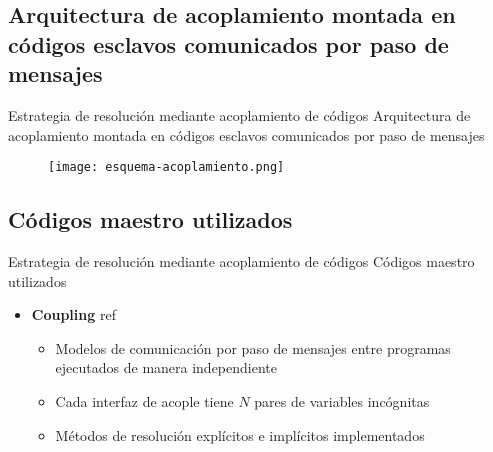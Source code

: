 \subsection{Arquitectura de acoplamiento montada en códigos esclavos comunicados por paso de mensajes}

\begin{frame}
{Estrategia de resolución mediante acoplamiento de códigos}
{Arquitectura de acoplamiento montada en códigos esclavos comunicados por paso de mensajes}

\begin{figure}
\centering{}
\texttt{[image: esquema-acoplamiento.png]}
\end{figure}


\end{frame}

\subsection{Códigos maestro utilizados}

\begin{frame}
{Estrategia de resolución mediante acoplamiento de códigos}
{Códigos maestro utilizados}

\begin{itemize}
\item \textbf{Coupling} ref
  \begin{itemize}
  \item <1-> Modelos de comunicación por paso de mensajes entre programas ejecutados de manera independiente
  \item <2-> Cada interfaz de acople tiene $N$ pares de variables incógnitas
  \item <3-> Métodos de resolución explícitos e implícitos implementados
  \end{itemize}
\end{itemize}

\end{frame}

